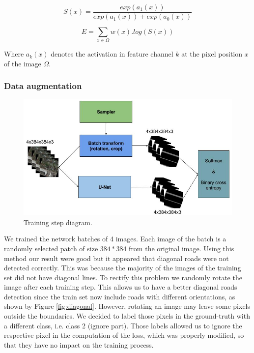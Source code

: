 \documentclass[10pt,conference,compsocconf]{IEEEtran}
\begin{document}
\begin{equation}
	S(x) = \frac{exp(a_1(x))}{exp(a_1(x))+exp(a_0(x))}
\end{equation}

\begin{equation}
	E = \sum\limits_{x \in \Omega} w(x).log(S(x))
\end{equation}

Where $a_k(x)$ denotes the activation in feature channel $k$ at the pixel position $x$ of the image $\Omega$.

\subsubsection*{Data augmentation}

\begin{figure}[h]
 \centering
 \includegraphics[width=0.7\columnwidth]{img/dataaug.png}
 \caption{Training step diagram.}
 \vspace{-3mm}
 \label{fig:denoise-fourier}
\end{figure}

We trained the network  batches of 4 images. Each image of the batch is a randomly selected patch of size $384*384$ from the original image. Using this method our result were good but it appeared that diagonal roads were not detected correctly. This was because the majority of the images of the training set did not have diagonal lines. To rectify this problem we randomly rotate the image after each training step. This allows us to have a better diagonal roads detection since the train set now include roads with different orientations, as shown by Figure \ref{fig:diagonal}. However, rotating an image may leave some pixels outside the boundaries. We decided to label those pixels in the ground-truth with a different class, i.e. class 2 (ignore part). Those labels allowed us to ignore the respective pixel in the computation of the loss, which was properly modified, so that they have no impact on the training process.
\end{document}

